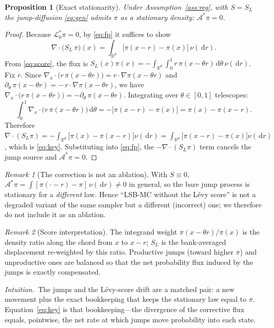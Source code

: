 \documentclass[11pt]{article}
\theoremstyle{plain}
\newtheorem{proposition}{Proposition}
\theoremstyle{remark}
\newtheorem{remark}{Remark}
\newcommand{\R}{\mathbb{R}}
\newcommand{\dd}{\,\mathrm{d}}
\newcommand{\plainwords}[1]{\begin{plainbox}\noindent\textit{Intuition.\ }#1\end{plainbox}}
\begin{document}
\begin{proposition}[Exact stationarity]\label{prop:stationarity}
Under Assumption~\ref{ass:reg}, with $S=S_L$ the jump-diffusion \eqref{eq:gen}
admits $\pi$ as a stationary density: $\mathcal A^{*}\pi=0$.
\end{proposition}
\begin{proof}
Because $\mathcal L_0^{*}\pi=0$, by \eqref{eq:fp} it suffices to show
\begin{equation}\label{eq:key}
\nabla\!\cdot\!\big(S_L\,\pi\big)(x)=\int_{\R^d}\!\big[\pi(x-r)-\pi(x)\big]\,\nu(\dd r).
\end{equation}
From \eqref{eq:score}, the flux is
$S_L(x)\pi(x)=-\int_{\R^d}\!\int_0^1 r\,\pi(x-\theta r)\dd\theta\,\nu(\dd r)$.
Fix $r$. Since $\nabla_x\!\cdot\!\big(r\,\pi(x-\theta r)\big)=r\!\cdot\!\nabla\pi(x-\theta r)$
and $\partial_\theta\,\pi(x-\theta r)=-\,r\!\cdot\!\nabla\pi(x-\theta r)$, we have
$\nabla_x\!\cdot\!\big(r\,\pi(x-\theta r)\big)=-\partial_\theta\,\pi(x-\theta r)$.
Integrating over $\theta\in[0,1]$ telescopes:
\[
\int_0^1\nabla_x\!\cdot\!\big(r\,\pi(x-\theta r)\big)\dd\theta
=-\big[\pi(x-r)-\pi(x)\big]=\pi(x)-\pi(x-r).
\]
Therefore
$\nabla\!\cdot\!(S_L\pi)=-\int_{\R^d}\!\big[\pi(x)-\pi(x-r)\big]\nu(\dd r)
=\int_{\R^d}\!\big[\pi(x-r)-\pi(x)\big]\nu(\dd r)$, which is \eqref{eq:key}.
Substituting into \eqref{eq:fp}, the $-\nabla\!\cdot\!(S_L\pi)$ term cancels the jump
source and $\mathcal A^{*}\pi=0$.
\end{proof}

\begin{remark}[The correction is not an ablation]\label{rem:nofree}
With $S\equiv 0$, $\mathcal A^{*}\pi=\int[\pi(\cdot-r)-\pi]\,\nu(\dd r)\neq 0$ in
general, so the bare jump process is stationary for a \emph{different} law. Hence
``LSB-MC without the L\'evy score'' is not a degraded variant of the same sampler
but a different (incorrect) one; we therefore do not include it as an ablation.
\end{remark}

\begin{remark}[Score interpretation]
The integrand weight $\pi(x-\theta r)/\pi(x)$ is the density ratio along the chord
from $x$ to $x-r$; $S_L$ is the bank-averaged displacement re-weighted by this
ratio. Productive jumps (toward higher $\pi$) and unproductive ones are balanced so
that the net probability flux induced by the jumps is exactly compensated.
\end{remark}

\plainwords{The jumps and the L\'evy-score drift are a matched pair: a new
movement plus the exact bookkeeping that keeps the stationary law equal to $\pi$.
Equation~\eqref{eq:key} is that bookkeeping---the divergence of the corrective flux
equals, pointwise, the net rate at which jumps move probability into each state.}
\end{document}
